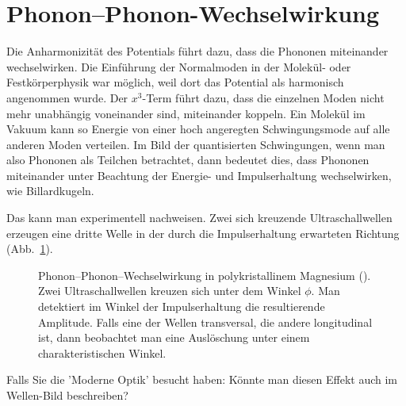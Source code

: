 




\section*{Phonon--Phonon-Wechselwirkung}

Die Anharmonizität des Potentials führt dazu, dass die Phononen miteinander wechselwirken. Die Einführung der Normalmoden in der Molekül- oder Festkörperphysik war möglich, weil dort das Potential als harmonisch angenommen wurde. Der $x^3$-Term führt dazu, dass die einzelnen Moden nicht mehr unabhängig voneinander sind, miteinander koppeln. Ein Molekül im Vakuum kann so Energie von einer hoch angeregten Schwingungsmode auf alle anderen Moden verteilen. Im Bild der quantisierten Schwingungen, wenn man also Phononen als Teilchen betrachtet, dann bedeutet dies, dass Phononen miteinander unter Beachtung der Energie- und Impulserhaltung wechselwirken, wie Billardkugeln.

Das kann man experimentell nachweisen. Zwei sich kreuzende Ultraschallwellen erzeugen eine dritte Welle in der durch die Impulserhaltung erwarteten Richtung (Abb.~\ref{fig:1_US_interaction}).

\begin{figure} 
    
    \caption{Phonon--Phonon--Wechselwirkung in polykristallinem Magnesium (\cite{RollinsJr1964}). Zwei Ultraschallwellen kreuzen sich unter dem Winkel $\phi$. Man detektiert im Winkel der Impulserhaltung die resultierende Amplitude. Falls eine der Wellen transversal, die andere longitudinal ist, dann beobachtet man eine Auslöschung unter einem charakteristischen Winkel. }
    \label{fig:1_US_interaction}
\end{figure}

\begin{questions} 
    \item Falls Sie die 'Moderne Optik' besucht haben: Könnte man diesen Effekt auch im Wellen-Bild beschreiben?
\end{questions}
     

